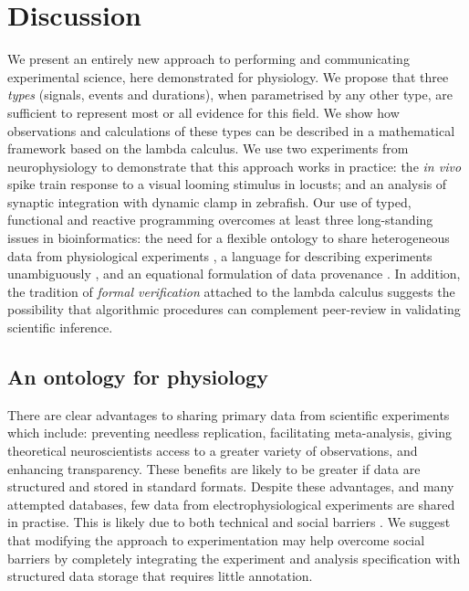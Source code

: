 \section*{Discussion}

We present an entirely new approach to performing and communicating
experimental science, here demonstrated for physiology. We propose
that three \emph{types} (signals, events and durations), when
parametrised by any other type, are sufficient to represent most or
all evidence for this field. We show how observations and calculations
of these types can be described in a mathematical framework based on
the lambda calculus. We use two experiments from neurophysiology to
demonstrate that this approach works in practice: the \emph{in vivo}
spike train response to a visual looming stimulus in locusts; and an
analysis of synaptic integration with dynamic clamp in zebrafish. Our use
of typed, functional and reactive programming overcomes at least three
long-standing issues in bioinformatics: the need for a flexible
ontology to share heterogeneous data from physiological experiments
\cite{Amari2002}, a language for describing experiments unambiguously
\cite{Murray-Rust2002}, and an equational formulation of data
provenance \cite{Pool2002}. In addition, the tradition of
\emph{formal verification} attached to the lambda calculus
\cite{Harrison2009,DeBruijn1968,Bird1996,Hindley2008}
suggests the possibility that algorithmic procedures can complement
peer-review in validating scientific inference.

\subsection*{An ontology for physiology}

There are clear advantages to sharing primary data from scientific
experiments \cite{Insel2003} which include: preventing needless replication,
facilitating meta-analysis, giving theoretical neuroscientists access
to a greater variety of observations, and enhancing transparency. These
benefits are likely to be greater if data are structured and stored in
standard formats. Despite these advantages, and many attempted
databases, few data from electrophysiological experiments are
shared in practise. This is likely due to both technical and social
barriers \cite{Amari2002}. We suggest that modifying the approach to
experimentation may help overcome social barriers by completely
integrating the experiment and analysis specification with structured
data storage that requires little annotation.

